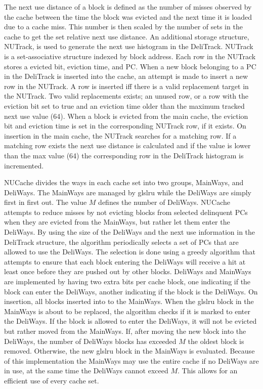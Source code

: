 The next use distance of a block is defined as the number of misses observed by the cache between the time the block was evicted and the next time it is loaded due to a cache miss.
This number is then scaled by the number of sets in the cache to get the set relative next use distance.
An additional storage structure, NUTrack, is used to generate the next use histogram in the DeliTrack.
NUTrack is a set-associative structure indexed by block address.
Each row in the NUTrack stores a evicted bit, eviction time, and PC.
When a new block belonging to a PC in the DeliTrack is inserted into the cache, an attempt is made to insert a new row in the NUTrack. 
A row is inserted iff there is a valid replacement target in the NUTrack.
Two valid replacements exists; an unused row, or a row with the eviction bit set to true and an eviction time older than the maximum tracked next use value (64).
When a block is evicted from the main cache, the eviction bit and eviction time is set in the corresponding NUTrack row, if it exists.
On insertion in the main cache, the NUTrack searches for a matching row. 
If a matching row exists the next use distance is calculated and if the value is lower than the max value (64) the corresponding row in the DeliTrack histogram is incremented.

NUCache divides the ways in each cache set into two groups, MainWays, and DeliWays.
The MainWays are managed by gls{lru} while the DeliWays are simply first in first out.
The value $M$ defines the number of DeliWays.
NUCache attempts to reduce misses by not evicting blocks from selected delinquent PCs when they are evicted from the MainWays, but rather let them enter the DeliWays.
By using the size of the DeliWays and the next use information in the DeliTrack structure, the algorithm periodically selects a set of PCs that are allowed to use the DeliWays.
The selection is done using a greedy algorithm that attempts to ensure that each block entering the DeliWays will receive a hit at least once before they are pushed out by other blocks.
DeliWays and MainWays are implemented by having two extra bits per cache block, one indicating if the block can enter the DeliWays, another indicating if the block is the DeliWays.
On insertion, all blocks inserted into to the MainWays.
When the gls{lru} block in the MainWays is about to be replaced, the algorithm checks if it is marked to enter the DeliWays.
If the block is allowed to enter the DeliWays, it will not be evicted but rather moved from the MainWays.
If, after moving the new block into the DeliWays, the number of DeliWays blocks has exceeded $M$ the oldest block is removed.
Otherwise, the new gls{lru} block in the MainWays is evaluated.
Because of this implementation the MainWays may use the entire cache if no DeliWays are in use, at the same time the DeliWays cannot exceed $M$.
This allows for an efficient use of every cache set.

